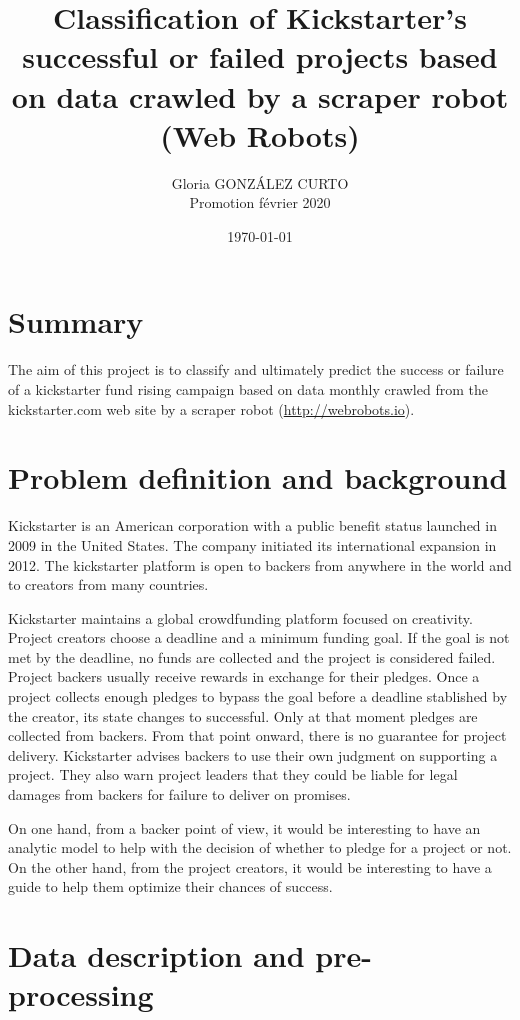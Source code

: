 \documentclass{article}
\title{Classification of Kickstarter's successful or failed projects based on data crawled by a scraper robot (Web Robots)}
\author{Gloria GONZÁLEZ CURTO\\Promotion février 2020}
\date{\today}
\begin{document}
\maketitle

\tableofcontents

\newpage

\section{Summary}
\label{ref:sum}
The aim of this project is to classify and ultimately predict the success or failure of a kickstarter fund rising campaign based on data monthly crawled from the kickstarter.com web site by a scraper robot (\url{http://webrobots.io}).

\section{Problem definition and background}
Kickstarter is an American corporation with a public benefit status launched in 2009 in the United States. The company initiated its international expansion in 2012. The kickstarter platform is open to backers from anywhere in the world and to creators from many countries.

Kickstarter maintains a global crowdfunding platform focused on creativity. Project creators choose a deadline and a minimum funding goal. If the goal is not met by the deadline, no funds are collected and the project is considered failed. Project backers usually receive rewards in exchange for their pledges.
Once a project collects enough pledges to bypass the goal before a deadline stablished by the creator, its state changes to successful. Only at that moment pledges are collected from backers. From that point onward, there is no guarantee for project delivery. Kickstarter advises backers to use their own judgment on supporting a project. They also warn project leaders that they could be liable for legal damages from backers for failure to deliver on promises.
 
On one hand, from a backer point of view, it would be interesting to have an analytic model to help with the decision of whether to pledge for a project or not. On the other hand, from the project creators, it would be interesting to have a guide to help them optimize their chances of success.

\section{Data description and pre-processing}
\label{sec:data_desc}
\end{document}
